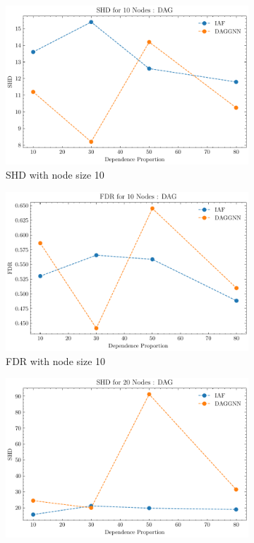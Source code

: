 \documentclass[10pt]{article}
\begin{document}
\begin{figure}
    \centering
    \begin{subfigure}{0.45\textwidth}
        \includegraphics[width=\textwidth]{fig/SHD_dependence_10_DAG_threshold0.3.pdf}
        \caption{SHD with node size 10}
        \label{SHD_node10}
    \end{subfigure}
    \hfill
    \begin{subfigure}{0.45\textwidth}
        \includegraphics[width=\textwidth]{fig/FDR_dependence_10_DAG_threshold0.3.pdf}
        \caption{FDR with node size 10}
        \label{FDR_node10}
    \end{subfigure}
    \begin{subfigure}{0.45\textwidth}
        \includegraphics[width=\textwidth]{fig/SHD_dependence_20_DAG_threshold0.3.pdf}

\end{subfigure}
\end{figure}
\end{document}
